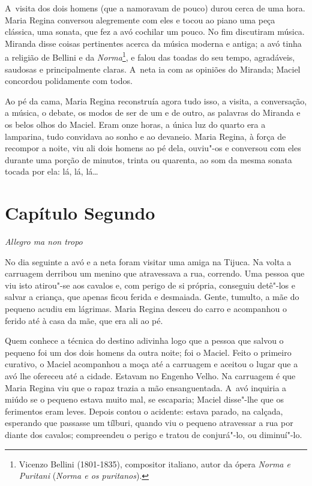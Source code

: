 A~visita dos dois homens (que a namoravam de pouco) durou cerca de uma
hora. Maria Regina conversou alegremente com eles e tocou ao piano uma
peça clássica, uma sonata, que fez a avó cochilar um pouco. No fim
discutiram música. Miranda disse coisas pertinentes acerca da música
moderna e antiga; a avó tinha a religião de Bellini e da
\emph{Norma}\footnote{Vicenzo Bellini (1801-1835), compositor italiano,
  autor da ópera \emph{Norma e  Puritani} (\emph{Norma e os
  puritanos}).}, e falou das toadas do seu tempo, agradáveis, saudosas e
principalmente claras. A~neta ia com as opiniões do Miranda; Maciel
concordou polidamente com todos.

Ao pé da cama, Maria Regina reconstruía agora tudo isso, a visita, a
conversação, a música, o debate, os modos de ser de um e de outro, as
palavras do Miranda e os belos olhos do Maciel. Eram onze horas, a única
luz do quarto era a lamparina, tudo convidava ao sonho e ao devaneio.
Maria Regina, à força de recompor a noite, viu ali dois homens ao pé
dela, ouviu"-os e conversou com eles durante uma porção de minutos,
trinta ou quarenta, ao som da mesma sonata tocada por ela: lá, lá, lá\ldots{}

\section{Capítulo Segundo}

\emph{Allegro ma non tropo}

No dia seguinte a avó e a neta foram visitar uma amiga na Tijuca. Na
volta a carruagem derribou um menino que atravessava a rua, correndo.
Uma pessoa que viu isto atirou"-se aos cavalos e, com perigo de si
própria, conseguiu detê"-los e salvar a criança, que apenas ficou ferida
e desmaiada. Gente, tumulto, a mãe do pequeno acudiu em lágrimas. Maria
Regina desceu do carro e acompanhou o ferido até à casa da mãe, que era
ali ao pé.

Quem conhece a técnica do destino adivinha logo que a pessoa que salvou
o pequeno foi um dos dois homens da outra noite; foi o Maciel. Feito o
primeiro curativo, o Maciel acompanhou a moça até a carruagem e aceitou
o lugar que a avó lhe ofereceu até a cidade. Estavam no Engenho Velho.
Na carruagem é que Maria Regina viu que o rapaz trazia a mão
ensanguentada. A~avó inquiria a miúdo se o pequeno estava muito mal, se
escaparia; Maciel disse"-lhe que os ferimentos eram leves. Depois contou
o acidente: estava parado, na calçada, esperando que passasse um
tílburi, quando viu o pequeno atravessar a rua por diante dos cavalos;
compreendeu o perigo e tratou de conjurá"-lo, ou diminuí"-lo.

